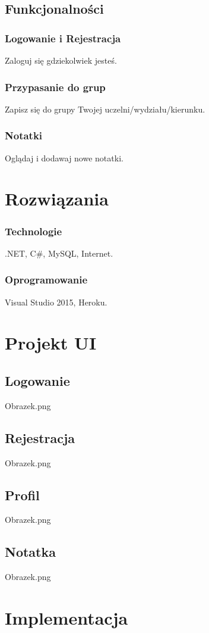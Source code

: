 \documentclass[12pt,a4paper]{article}
\begin{document}
		\subsection{Funkcjonalności}
			\subsubsection{Logowanie i Rejestracja}
				Zaloguj się gdziekolwiek jesteś.
			\subsubsection{Przypasanie do grup}
				Zapisz się do grupy Twojej uczelni/wydziału/kierunku.
			\subsubsection{Notatki}
				Oglądaj i dodawaj nowe notatki.
	\section{Rozwiązania}
		\subsubsection{Technologie}
			.NET, C\#, MySQL, Internet.
		\subsubsection{Oprogramowanie}
			Visual Studio 2015, Heroku.
	\section{Projekt UI}
		\subsection{Logowanie}
			Obrazek.png
		\subsection{Rejestracja}
			Obrazek.png
		\subsection{Profil}
			Obrazek.png
		\subsection{Notatka}
			Obrazek.png
	\section{Implementacja}
\end{document}
